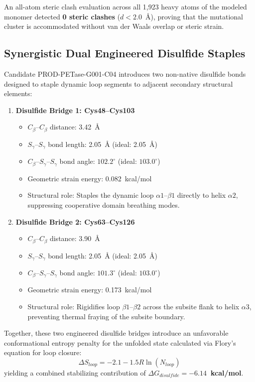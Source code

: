 \documentclass[journal=natcat,manuscript=article]{achemso}
\begin{document}
An all-atom steric clash evaluation across all 1,923 heavy atoms of the modeled monomer detected \textbf{0 steric clashes} ($d < 2.0$~\AA{}), proving that the mutational cluster is accommodated without van der Waals overlap or steric strain.

\subsection{Synergistic Dual Engineered Disulfide Staples}
Candidate PROD-PETase-G001-C04 introduces two non-native disulfide bonds designed to staple dynamic loop segments to adjacent secondary structural elements:
\begin{enumerate}
\item \textbf{Disulfide Bridge 1: Cys48--Cys103}
\begin{itemize}
\item $C_\beta\text{--}C_\beta$ distance: 3.42~\AA{}
\item $S_\gamma\text{--}S_\gamma$ bond length: 2.05~\AA{} (ideal: 2.05~\AA{})
\item $C_\beta\text{--}S_\gamma\text{--}S_\gamma$ bond angle: $102.2^\circ$ (ideal: $103.0^\circ$)
\item Geometric strain energy: 0.082~kcal/mol
\item Structural role: Staples the dynamic loop $\alpha1\text{--}\beta1$ directly to helix $\alpha2$, suppressing cooperative domain breathing modes.
\end{itemize}
\item \textbf{Disulfide Bridge 2: Cys63--Cys126}
\begin{itemize}
\item $C_\beta\text{--}C_\beta$ distance: 3.90~\AA{}
\item $S_\gamma\text{--}S_\gamma$ bond length: 2.05~\AA{} (ideal: 2.05~\AA{})
\item $C_\beta\text{--}S_\gamma\text{--}S_\gamma$ bond angle: $101.3^\circ$ (ideal: $103.0^\circ$)
\item Geometric strain energy: 0.173~kcal/mol
\item Structural role: Rigidifies loop $\beta1\text{--}\beta2$ across the subsite flank to helix $\alpha3$, preventing thermal fraying of the subsite boundary.
\end{itemize}
\end{enumerate}

Together, these two engineered disulfide bridges introduce an unfavorable conformational entropy penalty for the unfolded state calculated via Flory's equation for loop closure:
\begin{equation}
\Delta S_{loop} = -2.1 - 1.5 R \ln(N_{loop})
\end{equation}
yielding a combined stabilizing contribution of \textbf{$\Delta G_{disulfide} = -6.14$~kcal/mol}.
\end{document}
